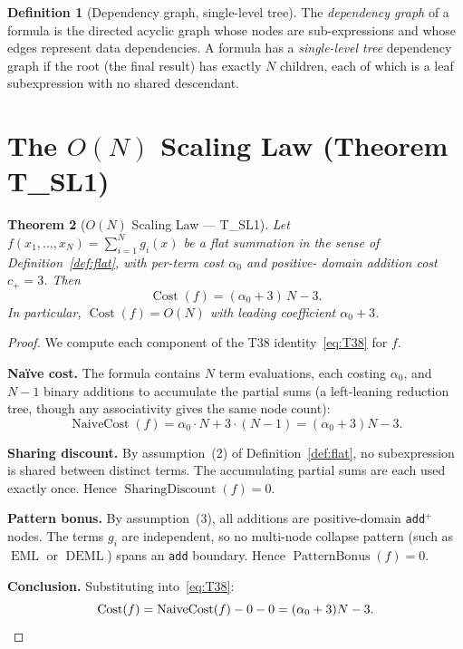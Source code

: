 \documentclass[12pt,a4paper]{article}
\newtheorem{theorem}{Theorem}[section]
\theoremstyle{definition}
\newtheorem{definition}[theorem]{Definition}
\newcommand{\EML}{\operatorname{EML}}
\newcommand{\DEML}{\operatorname{DEML}}
\newcommand{\Cost}{\operatorname{Cost}}
\newcommand{\NC}{\operatorname{NaiveCost}}
\newcommand{\SD}{\operatorname{SharingDiscount}}
\newcommand{\PB}{\operatorname{PatternBonus}}
\begin{document}
\begin{definition}[Dependency graph, single-level tree]
\label{def:deptree}
The \emph{dependency graph} of a formula is the directed acyclic graph whose
nodes are sub-expressions and whose edges represent data dependencies.
A formula has a \emph{single-level tree} dependency graph if the root
(the final result) has exactly $N$ children, each of which is a leaf
subexpression with no shared descendant.
\end{definition}

\section{The $O(N)$ Scaling Law (Theorem T\_SL1)}
\label{sec:linear}

\begin{theorem}[$O(N)$ Scaling Law --- T\_SL1]
\label{thm:TSL1}
Let $f(x_1, \ldots, x_N) = \sum_{i=1}^{N} g_i(x)$ be a flat summation in the
sense of Definition~\ref{def:flat}, with per-term cost $\alpha_0$ and positive-
domain addition cost $c_+ = 3$.  Then
\begin{equation}
  \label{eq:TSL1}
  \Cost(f) = (\alpha_0 + 3)\,N - 3.
\end{equation}
In particular, $\Cost(f) = O(N)$ with leading coefficient $\alpha_0 + 3$.
\end{theorem}

\begin{proof}
We compute each component of the T38 identity~\eqref{eq:T38} for $f$.

\medskip
\noindent\textbf{Na\"{i}ve cost.}
The formula contains $N$ term evaluations, each costing $\alpha_0$, and
$N - 1$ binary additions to accumulate the partial sums (a left-leaning
reduction tree, though any associativity gives the same node count):
\[
  \NC(f) = \alpha_0 \cdot N + 3 \cdot (N - 1) = (\alpha_0 + 3)N - 3.
\]

\medskip
\noindent\textbf{Sharing discount.}
By assumption~(2) of Definition~\ref{def:flat}, no subexpression is shared
between distinct terms.  The accumulating partial sums are each used exactly
once.  Hence $\SD(f) = 0$.

\medskip
\noindent\textbf{Pattern bonus.}
By assumption~(3), all additions are positive-domain \texttt{add}$^+$ nodes.
The terms $g_i$ are independent, so no multi-node collapse pattern (such as
$\EML$ or $\DEML$) spans an \texttt{add} boundary.  Hence $\PB(f) = 0$.

\medskip
\noindent\textbf{Conclusion.}
Substituting into~\eqref{eq:T38}:
\[
  \Cost(f) = \NC(f) - 0 - 0 = (\alpha_0 + 3)N - 3. \qedhere
\]
\end{proof}
\end{document}
